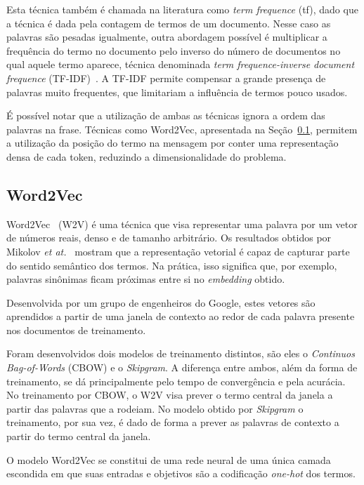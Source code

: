 Esta técnica também é chamada na literatura como \textit{term frequence} (tf), dado que a técnica é dada pela contagem
de termos de um documento.
Nesse caso as palavras são pesadas igualmente, outra abordagem possível é multiplicar a frequência do termo no documento
pelo inverso do número de documentos no qual aquele termo aparece, técnica denominada \textit{term frequence-inverse
document frequence} (TF-IDF)~\cite{salton88}.
A TF-IDF permite compensar a grande presença de palavras muito frequentes, que limitariam a influência de termos pouco
usados.

É possível notar que a utilização de ambas as técnicas ignora a ordem das palavras na frase.
Técnicas como Word2Vec, apresentada na Seção~\ref{sec:w2v}, permitem a utilização da posição do termo na mensagem por conter
uma representação densa de cada token, reduzindo a dimensionalidade do problema.

\subsection{Word2Vec} \label{sec:w2v}

Word2Vec~\cite{mikolov13} (W2V) é uma técnica que visa representar uma palavra por um vetor de números reais, denso e de
tamanho arbitrário.
Os resultados obtidos por Mikolov \textit{et at.}~\cite{mikolov13} mostram que a representação vetorial é capaz de
capturar parte do sentido semântico dos termos.
Na prática, isso significa que, por exemplo, palavras sinônimas ficam próximas entre si no \textit{embedding} obtido.

Desenvolvida por um grupo de engenheiros do Google, estes vetores são aprendidos a partir de uma janela de contexto
ao redor de cada palavra presente nos documentos de treinamento.

Foram desenvolvidos dois modelos de treinamento distintos, são eles o \textit{Continuos Bag-of-Words} (CBOW) e o
\textit{Skipgram}.
A diferença entre ambos, além da forma de treinamento, se dá principalmente pelo tempo de convergência e pela acurácia.
No treinamento por CBOW, o W2V visa prever o termo central da janela a partir das palavras que a rodeiam.
No modelo obtido por \textit{Skipgram} o treinamento, por sua vez, é dado de forma a prever as palavras de contexto a
partir do termo central da janela.

O modelo Word2Vec se constitui de uma rede neural de uma única camada escondida em que suas entradas e objetivos são a
codificação \textit{one-hot} dos termos.

